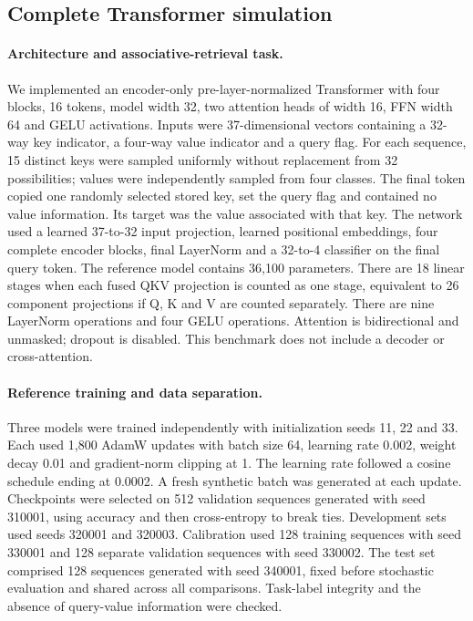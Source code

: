 \subsection{Complete Transformer simulation}
\label{methods:full_transformer}

\paragraph{Architecture and associative-retrieval task.}
We implemented an encoder-only pre-layer-normalized Transformer with four
blocks, 16 tokens, model width 32, two attention heads of width 16, FFN width
64 and GELU activations. Inputs were 37-dimensional vectors containing a
32-way key indicator, a four-way value indicator and a query flag.
For each sequence, 15 distinct keys were sampled uniformly without replacement
from 32 possibilities; values were independently sampled from four classes.
The final token copied one randomly selected stored key, set the query flag
and contained no value information. Its target was the value associated with
that key. The network used a learned 37-to-32 input projection, learned
positional embeddings, four complete encoder blocks, final LayerNorm and a
32-to-4 classifier on the final query token. The reference model contains
36,100 parameters. There are 18 linear stages when each fused QKV projection
is counted as one stage, equivalent to 26 component projections if Q, K and V
are counted separately. There are nine LayerNorm operations and four GELU
operations. Attention is bidirectional and unmasked; dropout is disabled.
This benchmark does not include a decoder or cross-attention.

\paragraph{Reference training and data separation.}
Three models were trained independently with initialization seeds 11, 22
and 33. Each used 1,800 AdamW updates with batch size 64, learning rate 0.002,
weight decay 0.01 and gradient-norm clipping at 1. The learning rate followed
a cosine schedule ending at 0.0002. A fresh synthetic batch was generated at
each update. Checkpoints were selected on 512 validation sequences generated
with seed 310001, using accuracy and then cross-entropy to break ties.
Development sets used seeds 320001 and 320003. Calibration used 128 training
sequences with seed 330001 and 128 separate validation sequences with seed
330002. The test set comprised 128 sequences generated with seed 340001,
fixed before stochastic evaluation and shared across all comparisons.
Task-label integrity and the absence of query-value information were checked.

